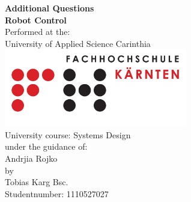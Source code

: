 \begin{titlepage}

\begin{center}

\textbf{\LARGE Additional Questions}\\[1.2cm]
\textbf{\LARGE Robot Control}\\[2.5cm]


Performed at the:\\
\large University of Applied Science Carinthia 
\includegraphics[width=0.60\textwidth]{pics/fh_logo}\\[0.0cm]    
\large University course: Systems Design\\[1cm]
\small under the guidance of:\\
\large Andrjia Rojko\\[2cm]

\normalsize
\large by\\[0.5cm]
Tobias Karg Bsc.\\[0.2cm]
Studentnumber: 1110527027\\[0.2cm]

\normalsize


\vfill


\end{center}

\end{titlepage}